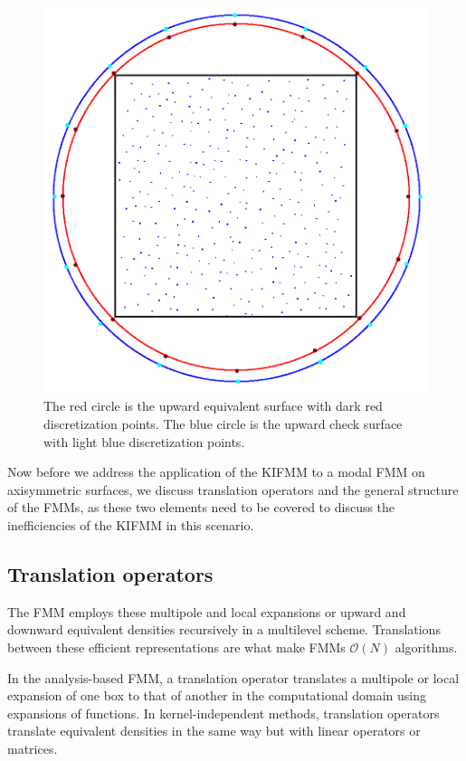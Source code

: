 \documentclass[11pt, oneside]{article}   	%
\begin{document}
\begin{figure}[h]
\caption{The red circle is the upward equivalent surface with dark red discretization points. The blue circle is the upward check surface with light blue discretization points.}
\label{fig:6}
\centering
\includegraphics[scale=0.25]{eqdens1}
\end{figure}

Now before we address the application of the KIFMM to a modal FMM on axisymmetric surfaces, we discuss translation operators and the general structure of the FMMs, as these two elements need to be covered to discuss the inefficiencies of the KIFMM in this scenario.

\subsection{Translation operators}
The FMM employs these multipole and local expansions or upward and downward equivalent densities recursively in a multilevel scheme. Translations between these efficient representations are what make FMMs $\mathcal{O}(N)$ algorithms.

In the analysis-based FMM, a translation operator translates a multipole or local expansion of one box to that of another in the computational domain using expansions of functions. In kernel-independent methods, translation operators translate equivalent densities in the same way but with linear operators or matrices.
\end{document}
